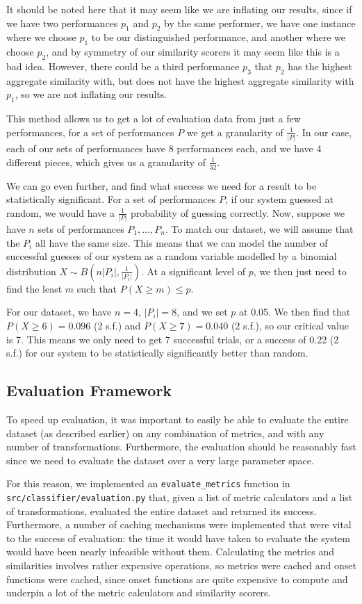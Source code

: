 \documentclass[oneside, class=book, 12pt, crop=false]{standalone}
\begin{document}
It should be noted here that it may seem like we are inflating our results, since if we have two performances $p_1$ and $p_2$ by the same performer, we have one instance where we choose $p_1$ to be our distinguished performance, and another where we choose $p_2$, and by symmetry of our similarity scorers it may seem like this is a bad idea. However, there could be a third performance $p_3$ that $p_2$ has the highest aggregate similarity with, but does not have the highest aggregate similarity with $p_1$, so we are not inflating our results.

This method allows us to get a lot of evaluation data from just a few performances, for a set of performances $P$ we get a granularity of $\frac{1}{|P|}$. In our case, each of our sets of performances have 8 performances each, and we have 4 different pieces, which gives us a granularity of $\frac{1}{32}$.

We can go even further, and find what success we need for a result to be statistically significant. For a set of performances $P$, if our system guessed at random, we would have a $\frac{1}{|P|}$ probability of guessing correctly. Now, suppose we have $n$ sets of performances $P_1, \ldots, P_n$. To match our dataset, we will assume that the $P_i$ all have the same size. This means that we can model the number of successful guesses of our system as a random variable modelled by a binomial distribution $X \sim B(n|P_i|, \frac{1}{|P_i|})$. At a significant level of $p$, we then just need to find the least $m$ such that $P(X \geq m) \leq p$.

For our dataset, we have $n=4$, $|P_i| = 8$, and we set $p$ at 0.05. We then find that $P(X \geq 6) = 0.096$ (2 s.f.) and $P(X \geq 7) = 0.040$ (2 s.f.), so our critical value is 7. This means we only need to get 7 successful trials, or a success of 0.22 (2 s.f.) for our system to be statistically significantly better than random.

\subsection{Evaluation Framework}

To speed up evaluation, it was important to easily be able to evaluate the entire dataset (as described earlier) on any combination of metrics, and with any number of transformations. Furthermore, the evaluation should be reasonably fast since we need to evaluate the dataset over a very large parameter space.

For this reason, we implemented an \texttt{evaluate\_metrics} function in \texttt{src/classifier/evaluation.py} that, given a list of metric calculators and a list of transformations, evaluated the entire dataset and returned its success. Furthermore, a number of caching mechanisms were implemented that were vital to the success of evaluation: the time it would have taken to evaluate the system would have been nearly infeasible without them. Calculating the metrics and similarities involves rather expensive operations, so metrics were cached and onset functions were cached, since onset functions are quite expensive to compute and underpin a lot of the metric calculators and similarity scorers.
\end{document}
